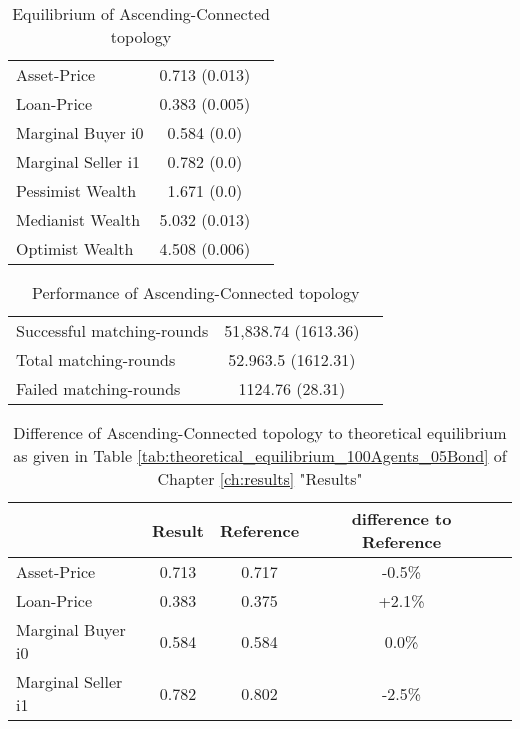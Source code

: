 \documentclass[Bachelorarbeit.tex]{subfiles}
\begin{document}
\begin{table}[H]
	\caption{Equilibrium of Ascending-Connected topology}
	\centering
	\begin{tabular} { l c r }
		\hline
		Asset-Price & 0.713 (0.013) \\
		Loan-Price & 0.383 (0.005) \\
		Marginal Buyer i0 & 0.584 (0.0) \\
		Marginal Seller i1 & 0.782 (0.0) \\
		\hline
		Pessimist Wealth & 1.671 (0.0) \\
		Medianist Wealth & 5.032 (0.013) \\
		Optimist Wealth & 4.508 (0.006) \\
		\hline
	\end{tabular}
\end{table} 

\begin{table}[H]
	\caption{Performance of Ascending-Connected topology}
	\centering
	\begin{tabular} { l c r }
		\hline
		Successful matching-rounds & 51,838.74 (1613.36) \\
		Total matching-rounds & 52.963.5 (1612.31) \\
		Failed matching-rounds & 1124.76 (28.31) \\
		\hline
	\end{tabular}
\end{table}

\begin{table}[H]
	\caption{Difference of Ascending-Connected topology to theoretical equilibrium as given in Table \ref{tab:theoretical_equilibrium_100Agents_05Bond} of Chapter \ref{ch:results} "Results"}
	\centering
	\begin{tabular} { l c c c r }
		& Result & Reference & difference to Reference \\
		\hline
		Asset-Price & 0.713 & 0.717 & -0.5\% \\
		Loan-Price & 0.383 & 0.375 & +2.1\% \\
		Marginal Buyer i0 & 0.584 & 0.584 & 0.0\% \\
		Marginal Seller i1 & 0.782 & 0.802 & -2.5\% \\
		\hline
	\end{tabular}
\end{table} 
\end{document}
